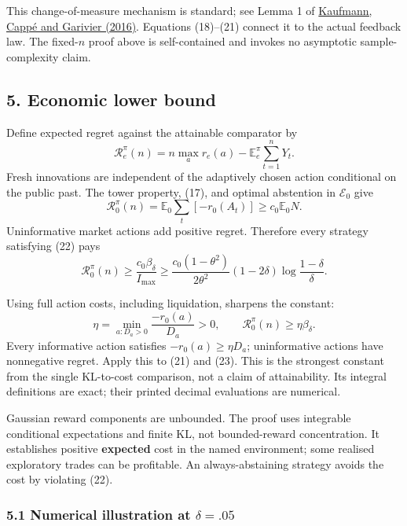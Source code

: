 \documentclass[
  10pt,
  a4paper,
]{article}
\begin{document}
This change-of-measure mechanism is standard; see Lemma 1 of
\href{https://jmlr.org/papers/volume17/kaufman16a/kaufman16a.pdf}{Kaufmann,
Cappé and Garivier (2016)}. Equations (18)--(21) connect it to the
actual feedback law. The fixed-\(n\) proof above is self-contained and
invokes no asymptotic sample-complexity claim.

\subsection{5. Economic lower bound}\label{economic-lower-bound}

Define expected regret against the attainable comparator by \[
\mathcal R_e^\pi(n)
=n\max_a r_e(a)-\mathbb E_e^\pi\sum_{t=1}^nY_t.
\tag{25}
\] Fresh innovations are independent of the adaptively chosen action
conditional on the public past. The tower property, (17), and optimal
abstention in \(\mathcal E_0\) give \[
\mathcal R_0^\pi(n)
=\mathbb E_0\sum_t[-r_0(A_t)]
\ge c_0\mathbb E_0N.
\] Uninformative market actions add positive regret. Therefore every
strategy satisfying (22) pays \[
\boxed{
\mathcal R_0^\pi(n)\ge
\frac{c_0\beta_\delta}{I_{\max}}
\ge
\frac{c_0(1-\theta^2)}{2\theta^2}
(1-2\delta)\log\frac{1-\delta}{\delta}.
}
\tag{26}
\]

Using full action costs, including liquidation, sharpens the constant:
\[
\eta=\min_{a:D_a>0}\frac{-r_0(a)}{D_a}>0,\qquad
\boxed{\mathcal R_0^\pi(n)\ge\eta\beta_\delta.}
\tag{27}
\] Every informative action satisfies \(-r_0(a)\ge\eta D_a\);
uninformative actions have nonnegative regret. Apply this to (21) and
(23). This is the strongest constant from the single KL-to-cost
comparison, not a claim of attainability. Its integral definitions are
exact; their printed decimal evaluations are numerical.

Gaussian reward components are unbounded. The proof uses integrable
conditional expectations and finite KL, not bounded-reward
concentration. It establishes positive \textbf{expected} cost in the
named environment; some realised exploratory trades can be profitable.
An always-abstaining strategy avoids the cost by violating (22).

\subsubsection{\texorpdfstring{5.1 Numerical illustration at
\(\delta=.05\)}{5.1 Numerical illustration at \textbackslash delta=.05}}\label{numerical-illustration-at-delta.05}
\end{document}
